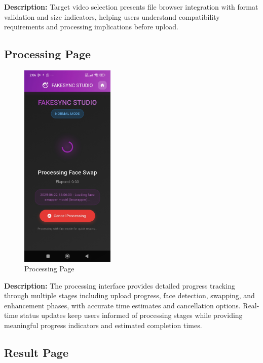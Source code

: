 \documentclass[12pt,a4paper]{report}
\begin{document}
\textbf{Description:} Target video selection presents file browser integration with format validation and size indicators, helping users understand compatibility requirements and processing implications before upload.

\subsection{Processing Page}

\begin{figure}[H]
\centering
\includegraphics[width=0.4\textwidth]{figures/processing_page.png}
\caption{Processing Page}
\label{fig:processing_page}
\end{figure}

\textbf{Description:} The processing interface provides detailed progress tracking through multiple stages including upload progress, face detection, swapping, and enhancement phases, with accurate time estimates and cancellation options. Real-time status updates keep users informed of processing stages while providing meaningful progress indicators and estimated completion times.

\subsection{Result Page}
\end{document}
